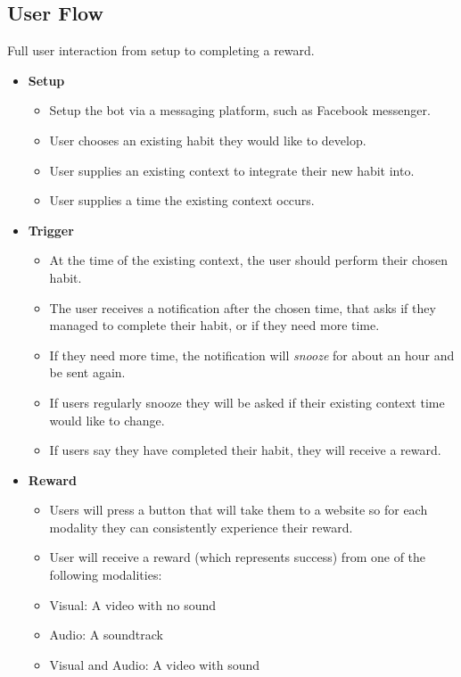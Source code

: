 \subsection{User Flow}

Full user interaction from setup to completing a reward.

\begin{itemize}
  \item \textbf{Setup}
  \begin{itemize}
    \item Setup the bot via a messaging platform, such as Facebook messenger.
    \item User chooses an existing habit they would like to develop.
    \item User supplies an existing context to integrate their new habit into.
    \item User supplies a time the existing context occurs.
  \end{itemize}
  \item \textbf{Trigger}
  \begin{itemize}
    \item At the time of the existing context, the user should perform their chosen habit.
    \item The user receives a notification after the chosen time, that asks if they managed to complete their habit, or if they need more time.
    \item If they need more time, the notification will \textit{snooze} for about an hour and be sent again.
    \item If users regularly snooze they will be asked if their existing context time would like to change.
    \item If users say they have completed their habit, they will receive a reward.
  \end{itemize}
  \item \textbf{Reward}
  \begin{itemize}
    \item Users will press a button that will take them to a website so for each modality they can consistently experience their reward.
    \item User will receive a reward (which represents success) from one of the following modalities:
    \item Visual: A video with no sound
    \item Audio: A soundtrack
    \item Visual and Audio: A video with sound
  \end{itemize}
\end{itemize}


\newpage
